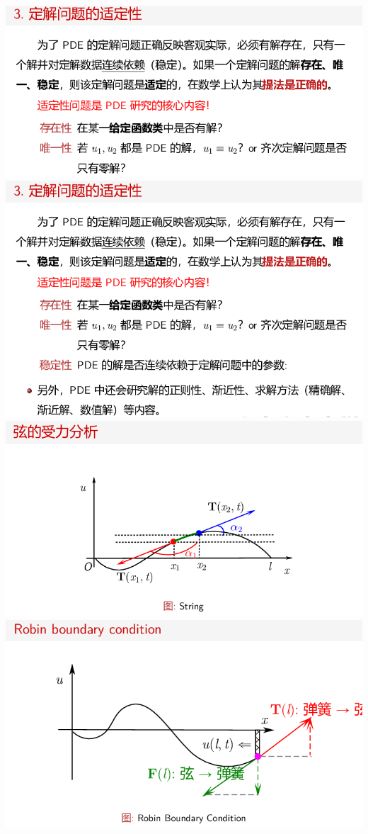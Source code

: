 \documentclass[11pt,a4paper]{ctexart}
\begin{document}
\begin{paracol}{2}
\includegraphics[width=\linewidth]{chap01_74.png}
\newpage
\includegraphics[width=\linewidth]{chap01_76.png}
\includegraphics[width=\linewidth]{chap01_77.png}
\includegraphics[width=\linewidth]{chap01_79.png}
\newpage


\end{paracol}
\end{document}
